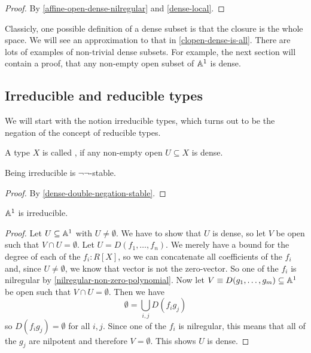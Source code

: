 \begin{proof}
  By \cref{affine-open-dense-nilregular} and \cref{dense-local}.
\end{proof}

Classicly, one possible definition of a dense subset
is that the closure is the whole space.
We will see an approximation to that in \cref{clopen-dense-is-all}.
There are lots of examples of non-trivial dense subsets.
For example, the next section will contain a proof,
that any non-empty open subset of $\mathbb{A}^1$ is dense.

\subsection{Irreducible and reducible types}

We will start with the notion irreducible types,
which turns out to be the negation of the concept of reducible types.

\begin{definition}%
  \label{irred}
  A type $X$ is called ,
  if any non-empty open $U\subseteq X$ is dense.
\end{definition}

\begin{proposition}%
  \label{irred-double-negation-stable}
  Being irreducible is $\neg\neg$-stable.
\end{proposition}

\begin{proof}
  By \cref{dense-double-negation-stable}.  
\end{proof}

\begin{proposition}%
  \label{A1-irreducible}
  $\mathbb{A}^1$ is irreducible.
\end{proposition}

\begin{proof}
  Let $U\subseteq \mathbb{A}^1$ with $U\neq \emptyset$.
  We have to show that $U$ is dense, so let $V$ be open such that $V\cap U=\emptyset$.
  Let $U=D(f_1,\dots,f_n)$.
  We merely have a bound for the degree of each of the $f_i:R[X]$,
  so we can concatenate all coefficients of the $f_i$ and, since $U\neq \emptyset$,
  we know that vector is not the zero-vector.
  So one of the $f_i$ is nilregular by \cref{nilregular-non-zero-polynomial}.
  Now let $V\equiv D(g_1,\dots,g_m)\subseteq \mathbb{A}^1$ be open such that $V\cap U=\emptyset$.
  Then we have
  \[ \emptyset=\bigcup_{i,j} D(f_ig_j) \]
  so $D(f_ig_j)=\emptyset$ for all $i,j$.
  Since one of the $f_i$ is nilregular,
  this means that all of the $g_j$ are nilpotent and therefore $V=\emptyset$.
  This shows $U$ is dense.
\end{proof}

